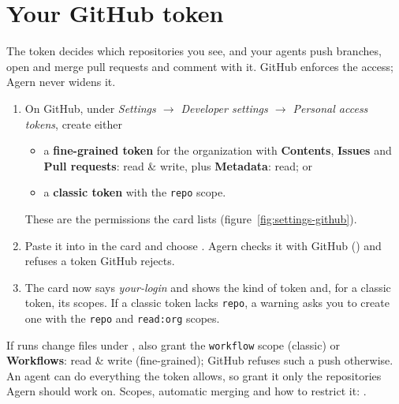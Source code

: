 
\section{Your GitHub token}\label{sec:github-token}

The token decides which repositories you see, and your agents push branches, open and merge
pull requests and comment with it. GitHub enforces the access; Agern never widens it.

\begin{enumerate}
  \item On GitHub, under \emph{Settings $\rightarrow$ Developer settings $\rightarrow$ Personal access
    tokens}, create either
    \begin{itemize}
      \item a \textbf{fine-grained token} for the organization with \textbf{Contents},
        \textbf{Issues} and \textbf{Pull requests}: read \& write, plus \textbf{Metadata}: read; or
      \item a \textbf{classic token} with the \texttt{repo} scope.
    \end{itemize}
    These are the permissions the  card lists (figure~\ref{fig:settings-github}).
  \item Paste it into  in the  card and choose .
    Agern checks it with GitHub () and refuses a token GitHub rejects.
  \item The card now says \emph{your-login} and shows the kind of token and,
    for a classic token, its scopes. If a classic token lacks \texttt{repo}, a warning asks you to
    create one with the \texttt{repo} and \texttt{read:org} scopes.
\end{enumerate}

\begin{note}
If runs change files under , also grant the \texttt{workflow} scope
(classic) or \textbf{Workflows}: read \& write (fine-grained); GitHub refuses such a push
otherwise. An agent can do everything the token allows, so grant it only the repositories Agern
should work on. Scopes, automatic merging and how to restrict it:
.
\end{note}

